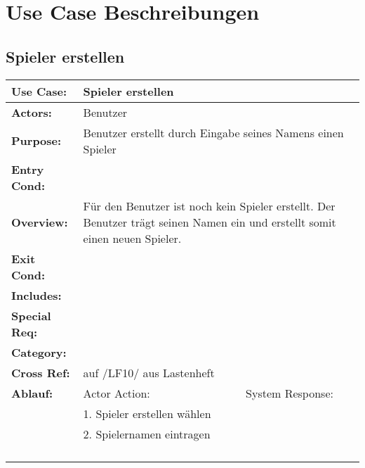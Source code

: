 \clearpage

\chapter{Use Case Beschreibungen}


\section{Spieler erstellen}
\begin{tabular}{|l|l|l|l|l|l|l|}
\hline
\textbf{Use Case:} & \multicolumn{ 6}{l|}{Spieler erstellen} \\ \hline
\textbf{Actors:} & \multicolumn{ 6}{l|}{Benutzer} \\ \hline
\textbf{Purpose:} & \multicolumn{ 6}{l|}{Benutzer erstellt durch Eingabe seines Namens einen Spieler} \\ \hline
\textbf{Entry Cond:} & \multicolumn{ 6}{c|}{} \\ \hline
\textbf{Overview:} & \multicolumn{ 6}{l|}{Für den Benutzer ist noch kein Spieler erstellt. Der Benutzer trägt seinen Namen ein 
und erstellt somit einen neuen Spieler.} \\ \hline
\textbf{Exit Cond:} & \multicolumn{ 6}{l|}{} \\ \hline
\textbf{Includes:} & \multicolumn{ 6}{l|}{} \\ \hline
\textbf{Special Req:} & \multicolumn{ 6}{l|}{} \\ \hline
\textbf{Category:} & \multicolumn{ 6}{l|}{} \\ \hline
\textbf{Cross Ref:} & \multicolumn{ 6}{l|}{auf /LF10/ aus Lastenheft} \\ \hline
\textbf{Ablauf:} & \multicolumn{ 3}{l|}{Actor Action:} & \multicolumn{ 3}{l|}{System Response:} \\ \hline
\multicolumn{ 1}{|c|}{} & \multicolumn{ 3}{l|}{1. Spieler erstellen wählen} & \multicolumn{ 3}{l|}{} \\ \cline{ 2- 7}
\multicolumn{ 1}{|l|}{} & \multicolumn{ 3}{l|}{2. Spielernamen eintragen} & \multicolumn{ 3}{l|}{} \\ \cline{ 2- 7}
\multicolumn{ 1}{|l|}{} & \multicolumn{ 3}{l|}{} & \multicolumn{ 3}{l|}{} \\ \cline{ 2- 7}
\multicolumn{ 1}{|l|}{} & \multicolumn{ 3}{l|}{} & \multicolumn{ 3}{l|}{} \\ \cline{ 2- 7}
\multicolumn{ 1}{|l|}{} & \multicolumn{ 3}{l|}{} & \multicolumn{ 3}{l|}{} \\ \cline{ 2- 7}
\multicolumn{ 1}{|l|}{} & \multicolumn{ 3}{l|}{} & \multicolumn{ 3}{l|}{} \\ \hline
\end{tabular}


